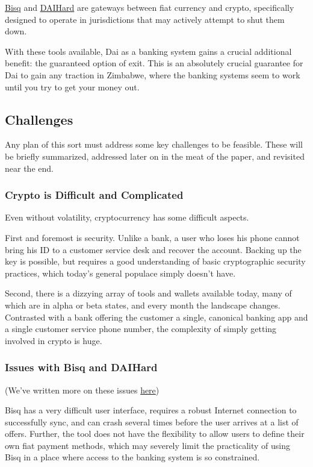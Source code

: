 \documentclass{article}
\begin{document}
\href{https://bisq.network/}{Bisq} and \href{daihard.io}{DAIHard} are gateways between fiat currency and crypto, specifically designed to operate in jurisdictions that may actively attempt to shut them down.

With these tools available, Dai as a banking system gains a crucial additional benefit: the guaranteed option of exit. This is an absolutely crucial guarantee for Dai to gain any traction in Zimbabwe, where the banking systems seem to work until you try to get your money out.

\subsection{Challenges} \label{challenges}

Any plan of this sort must address some key challenges to be feasible. These will be briefly summarized, addressed later on in the meat of the paper, and revisited near the end.

\subsubsection{Crypto is Difficult and Complicated} \label{difficult}

Even without volatility, cryptocurrency has some difficult aspects.

First and foremost is security. Unlike a bank, a user who loses his phone cannot bring his ID to a customer service desk and recover the account. Backing up the key is possible, but requires a good understanding of basic cryptographic security practices, which today's general populace simply doesn't have.

Second, there is a dizzying array of tools and wallets available today, many of which are in alpha or beta states, and every month the landscape changes. Contrasted with a bank offering the customer a single, canonical banking app and a single customer service phone number, the complexity of simply getting involved in crypto is huge.

\subsubsection{Issues with Bisq and DAIHard} \label{exchange issues}

(We've written more on these issues \href{https://bisq.network/}{here})

Bisq has a very difficult user interface, requires a robust Internet connection to successfully sync, and can crash several times before the user arrives at a list of offers. Further, the tool does not have the flexibility to allow users to define their own fiat payment methods, which may severely limit the practicality of using Bisq in a place where access to the banking system is so constrained.
\end{document}
